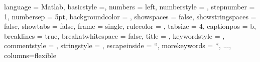 {	language = Matlab, 			%
	basicstyle =\tiny\monaco, 		%
	numbers = left, 				%
	numberstyle = \tiny\color{gray}\monaco, 	%
	stepnumber = 1, 			%
	numbersep = 5pt, 			%
	backgroundcolor = \color{white}, %
	showspaces = false, 			%
	showstringspaces = false, 		%
	showtabs = false, 			%
	frame = single, 				%
	rulecolor = \color{black}, 		%
	tabsize = 4, 				%
	captionpos = b, 				%
	breaklines = true, 			%
	breakatwhitespace = false, 	%
	title = \lstname, 				%
	keywordstyle = \color{blue}, 	%
	commentstyle = \color{dkgreen}, %
	stringstyle = \color{mauve}, 	%
	escapeinside = ``, 			%
	morekeywords = {*, ...},		%
	columns=flexible
}
\usepackage{accsupp}
\makeatother

